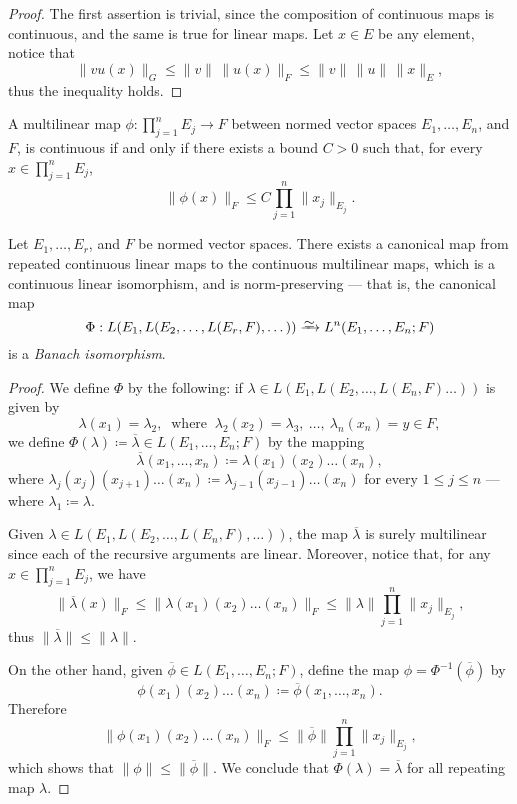 \begin{proof}
The first assertion is trivial, since the composition of continuous maps is
continuous, and the same is true for linear maps. Let \(x \in E\) be any element,
notice that
\[
  \|vu(x)\|_G
  \leq \|v\|\, \|u(x)\|_F
  \leq \|v\|\, \|u\|\, \|x\|_{E},
\]
thus the inequality holds.
\end{proof}

\begin{proposition}
\label{prop:multilinear-continous-iff-bounded}
A multilinear map \(\phi: \prod_{j=1}^n E_j \to F\) between normed vector spaces
\(E_1, \dots, E_n\), and \(F\), is continuous if and only if there exists a bound
\(C > 0\) such that, for every \(x \in \prod_{j = 1}^n E_j\),
\[
  \|\phi(x)\|_{F} \leq C \prod_{j=1}^n \|x_j\|_{E_j}.
\]
\end{proposition}

\begin{proposition}
\label{prop:canonical-iso-banach-multilinear}
Let \(E_1, \dots, E_r\), and \(F\) be normed vector spaces. There exists a
canonical map from repeated continuous linear maps to the continuous multilinear
maps, which is a continuous linear isomorphism, and is norm-preserving --- that
is, the canonical map
\[
  \Phi: L(E_1, L(E_2, \dots, L(E_r, F), \dots)) \isoto L^n(E_1, \dots, E_n; F)
\]
is a \emph{Banach isomorphism}.
\end{proposition}

\begin{proof}
We define \(\Phi\) by the following: if \(\lambda \in L(E_1, L(E_2, \dots,
L(E_n, F) \dots))\) is given by
\[
  \lambda(x_1) = \lambda_2,\ \text{ where }\ \lambda_2(x_2) = \lambda_3, \
  \dots, \ \lambda_n(x_n) = y \in F,
\]
we define \(\Phi(\lambda) \coloneq \overline{\lambda} \in L(E_1, \dots, E_n;
F)\) by the mapping
\[
  \overline\lambda(x_1, \dots, x_n) \coloneq \lambda(x_1)(x_2) \dots (x_n),
\]
where \(\lambda_j(x_j)(x_{j+1}) \dots (x_n) \coloneq \lambda_{j-1}(x_{j-1})
\dots (x_n)\) for every \(1 \leq j \leq n\) --- where \(\lambda_1 \coloneq
\lambda\).

Given \(\lambda \in L(E_1, L(E_2, \dots, L(E_n, F), \dots))\), the map
\(\overline\lambda\) is surely multilinear since each of the recursive arguments
are linear. Moreover, notice that, for any \(x \in \prod_{j=1}^n E_j\), we have
\[
  \|\overline\lambda(x)\|_{F}
  \leq \|\lambda(x_1) (x_2) \dots (x_n)\|_F
  \leq \|\lambda\| \prod_{j=1}^n \|x_{j}\|_{E_j},
\]
thus \(\|\overline\lambda\| \leq \|\lambda\|\).

On the other hand, given \(\overline\phi \in L(E_1, \dots, E_n; F)\), define the
map \(\phi = \Phi^{-1}(\overline\phi)\) by
\[
  \phi(x_1)(x_2) \dots (x_n) \coloneq \overline\phi(x_1, \dots, x_n).
\]
Therefore
\[
  \|\phi(x_1)(x_2) \dots (x_n)\|_{F}
  \leq \|\overline\phi\| \prod_{j=1}^n \|x_j\|_{E_j},
\]
which shows that \(\|\phi\| \leq \|\overline\phi\|\). We conclude that
\(\Phi(\lambda) = \overline\lambda\) for all repeating map \(\lambda\).
\end{proof}

